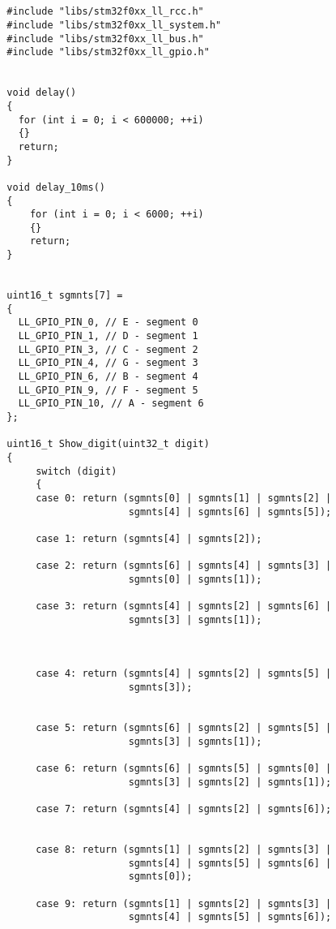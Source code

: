 
\begin{verbatim}
    
    
  #include "libs/stm32f0xx_ll_rcc.h"
  #include "libs/stm32f0xx_ll_system.h"
  #include "libs/stm32f0xx_ll_bus.h"
  #include "libs/stm32f0xx_ll_gpio.h"
  
  
  void delay()
  {
    for (int i = 0; i < 600000; ++i)
    {}
    return;
  }
  
  void delay_10ms()
  {
      for (int i = 0; i < 6000; ++i)
      {}
      return;
  }
  
  
  uint16_t sgmnts[7] =
  { 
    LL_GPIO_PIN_0, // E - segment 0
    LL_GPIO_PIN_1, // D - segment 1
    LL_GPIO_PIN_3, // C - segment 2
    LL_GPIO_PIN_4, // G - segment 3
    LL_GPIO_PIN_6, // B - segment 4
    LL_GPIO_PIN_9, // F - segment 5 
    LL_GPIO_PIN_10, // A - segment 6
  };
  
  uint16_t Show_digit(uint32_t digit)
  {
       switch (digit)
       {
       case 0: return (sgmnts[0] | sgmnts[1] | sgmnts[2] |
                       sgmnts[4] | sgmnts[6] | sgmnts[5]);
               
       case 1: return (sgmnts[4] | sgmnts[2]);
       
       case 2: return (sgmnts[6] | sgmnts[4] | sgmnts[3] |
                       sgmnts[0] | sgmnts[1]);
               
       case 3: return (sgmnts[4] | sgmnts[2] | sgmnts[6] | 
                       sgmnts[3] | sgmnts[1]);
                       
       
    
       case 4: return (sgmnts[4] | sgmnts[2] | sgmnts[5] | 
                       sgmnts[3]);
               
               
       case 5: return (sgmnts[6] | sgmnts[2] | sgmnts[5] | 
                       sgmnts[3] | sgmnts[1]);
               
       case 6: return (sgmnts[6] | sgmnts[5] | sgmnts[0] |
                       sgmnts[3] | sgmnts[2] | sgmnts[1]);
               
       case 7: return (sgmnts[4] | sgmnts[2] | sgmnts[6]);
                       
               
       case 8: return (sgmnts[1] | sgmnts[2] | sgmnts[3] |
                       sgmnts[4] | sgmnts[5] | sgmnts[6] |
                       sgmnts[0]);
         
       case 9: return (sgmnts[1] | sgmnts[2] | sgmnts[3] |
                       sgmnts[4] | sgmnts[5] | sgmnts[6]);
               

\end{verbatim}
